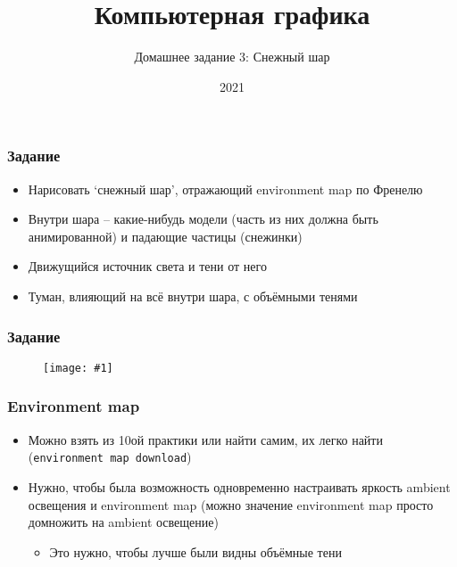 \documentclass{beamer}
\title{Компьютерная графика}
\subtitle{Домашнее задание 3: Снежный шар}
\date{2021}
\newcommand{\slideimage}[1]{
  \begin{figure}
    \begin{adjustbox}{width=\textwidth, totalheight=\textheight-2\baselineskip-2\baselineskip,keepaspectratio}
      \texttt{[image: \#1]}
    \end{adjustbox}
  \end{figure}
}
\begin{document}
\frame{\titlepage}

\begin{frame}[fragile]
\frametitle{Задание}
\begin{itemize}
\item Нарисовать `снежный шар', отражающий environment map по Френелю
\item Внутри шара -- какие-нибудь модели (часть из них должна быть анимированной) и падающие частицы (снежинки)
\item Движущийся источник света и тени от него
\item Туман, влияющий на всё внутри шара, с объёмными тенями
\end{itemize}
\end{frame}

\begin{frame}[fragile]
\frametitle{Задание}
\slideimage{example.png}
\end{frame}

\begin{frame}[fragile]
\frametitle{Environment map}
\begin{itemize}
\item Можно взять из 10ой практики или найти самим, их легко найти (\verb|environment map download|)
\item Нужно, чтобы была возможность одновременно настраивать яркость ambient освещения и environment map (можно значение environment map просто домножить на ambient освещение)
\begin{itemize}
\item Это нужно, чтобы лучше были видны объёмные тени
\end{itemize}
\end{itemize}
\end{frame}
\end{document}
